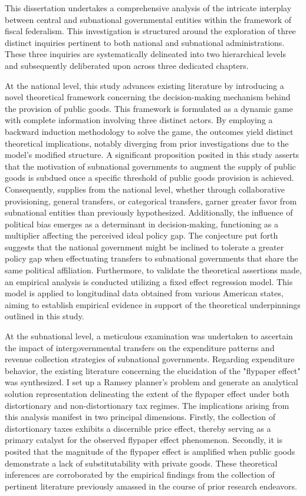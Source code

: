 
This dissertation undertakes a comprehensive analysis of the intricate interplay between central and subnational governmental entities within the framework of fiscal federalism. This investigation is structured around the exploration of three distinct inquiries pertinent to both national and subnational administrations. These three inquiries are systematically delineated into two hierarchical levels and subsequently deliberated upon across three dedicated chapters.

At the national level, this study advances existing literature by introducing a novel theoretical framework concerning the decision-making mechanism behind the provision of public goods. This framework is formulated as a dynamic game with complete information involving three distinct actors. By employing a backward induction methodology to solve the game, the outcomes yield distinct theoretical implications, notably diverging from prior investigations due to the model's modified structure. A significant proposition posited in this study asserts that the motivation of subnational governments to augment the supply of public goods is subdued once a specific threshold of public goods provision is achieved. Consequently, supplies from the national level, whether through collaborative provisioning, general transfers, or categorical transfers, garner greater favor from subnational entities than previously hypothesized. Additionally, the influence of political bias emerges as a determinant in decision-making, functioning as a multiplier affecting the perceived ideal policy gap. The conjecture put forth suggests that the national government might be inclined to tolerate a greater policy gap when effectuating transfers to subnational governments that share the same political affiliation. Furthermore, to validate the theoretical assertions made, an empirical analysis is conducted utilizing a fixed effect regression model. This model is applied to longitudinal data obtained from various American states, aiming to establish empirical evidence in support of the theoretical underpinnings outlined in this study.

At the subnational level, a meticulous examination was undertaken to ascertain the impact of intergovernmental transfers on the expenditure patterns and revenue collection strategies of subnational governments. Regarding expenditure behavior, the existing literature concerning the elucidation of the "flypaper effect" was synthesized. I set up a Ramsey planner’s problem and generate an analytical solution representation delineating the extent of the flypaper effect under both distortionary and non-distortionary tax regimes. The implications arising from this analysis manifest in two principal dimensions. Firstly, the collection of distortionary taxes exhibits a discernible price effect, thereby serving as a primary catalyst for the observed flypaper effect phenomenon. Secondly, it is posited that the magnitude of the flypaper effect is amplified when public goods demonstrate a lack of substitutability with private goods. These theoretical inferences are corroborated by the empirical findings from the collection of pertinent literature previously amassed in the course of prior research endeavors.

